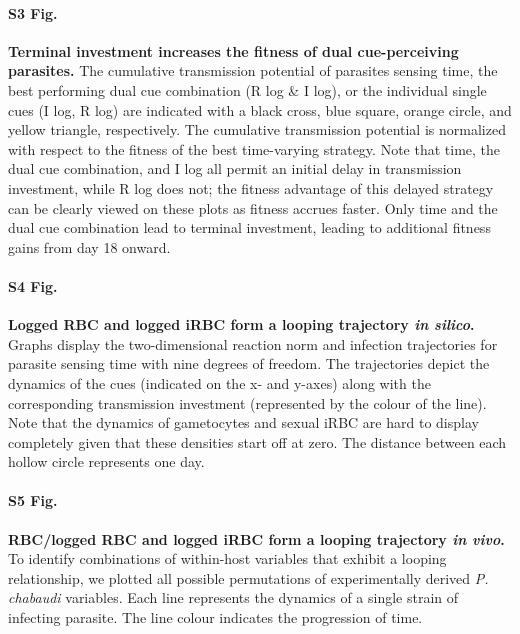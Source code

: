 \documentclass[10pt,letterpaper]{article}
\begin{document}
 \paragraph*{S3 Fig.}
\label{S3_Fig}
{\bf Terminal investment increases the fitness of dual cue-perceiving parasites.} The cumulative transmission potential of parasites sensing time, the best performing dual cue combination (R log \& I log), or the individual single cues (I log, R log) are indicated with a black cross, blue square, orange circle, and yellow triangle, respectively. The cumulative transmission potential is normalized with respect to the fitness of the best time-varying strategy. Note that time, the dual cue combination, and I log all permit an initial delay in transmission investment, while R log does not; the fitness advantage of this delayed strategy can be clearly viewed on these plots as fitness accrues faster. Only time and the dual cue combination lead to terminal investment, leading to additional fitness gains from day 18 onward. \newline 

\paragraph*{S4 Fig.}
\label{S4_Fig}
{\bf Logged RBC and logged iRBC form a looping trajectory \emph{in silico}.} Graphs display the two-dimensional reaction norm and infection trajectories for parasite sensing time with  nine degrees of freedom. The trajectories depict the dynamics of the cues (indicated on the x- and y-axes) along with the corresponding transmission investment (represented by the colour of the line). Note that the dynamics of gametocytes and sexual iRBC are hard to display completely given that these densities start off at zero. The distance between each hollow circle represents one day.\newline 

\paragraph*{S5 Fig.}
\label{S5_Fig}
{\bf RBC/logged RBC and logged iRBC form a looping trajectory \emph{in vivo}.} To identify combinations of within-host variables that exhibit a looping relationship, we plotted all possible permutations of experimentally derived \emph{P. chabaudi} variables. Each line represents the dynamics of a single strain of infecting parasite. The line colour indicates the progression of time.\newline 
\end{document}
